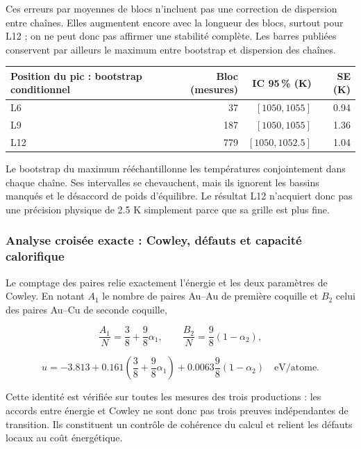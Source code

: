 Ces erreurs par moyennes de blocs n’incluent pas une correction de dispersion entre chaînes. Elles augmentent encore avec la longueur des blocs, surtout pour L12 ; on ne peut donc pas affirmer une stabilité complète. Les barres publiées conservent par ailleurs le maximum entre bootstrap et dispersion des chaînes.

\begin{center}\small\begin{tabular}{lrrr}\toprule

Position du pic : bootstrap conditionnel & Bloc (mesures) & IC 95\,\% (K) & SE (K)\\\midrule

L6 & 37 & $[1050,1055]$ & 0.94\\

L9 & 187 & $[1050,1055]$ & 1.36\\

L12 & 779 & $[1050,1052.5]$ & 1.04\\

\bottomrule\end{tabular}\end{center}

Le bootstrap du maximum rééchantillonne les températures conjointement dans chaque chaîne. Ses intervalles se chevauchent, mais ils ignorent les bassins manqués et le désaccord de poids d’équilibre. Le résultat L12 n’acquiert donc pas une précision physique de 2.5 K simplement parce que sa grille est plus fine.

\subsubsection{Analyse croisée exacte : Cowley, défauts et capacité calorifique}

Le comptage des paires relie exactement l’énergie et les deux paramètres de Cowley. En notant $A_1$ le nombre de paires Au--Au de première coquille et $B_2$ celui des paires Au--Cu de seconde coquille,

\[\frac{A_1}{N}=\frac38+\frac98\alpha_1,\qquad \frac{B_2}{N}=\frac98(1-\alpha_2),\]

\[u=-3.813+0.161\left(\frac38+\frac98\alpha_1\right)+0.0063\frac98(1-\alpha_2)\quad\mathrm{eV/atome}.\]

Cette identité est vérifiée sur toutes les mesures des trois productions : les accords entre énergie et Cowley ne sont donc pas trois preuves indépendantes de transition. Ils constituent un contrôle de cohérence du calcul et relient les défauts locaux au coût énergétique.

